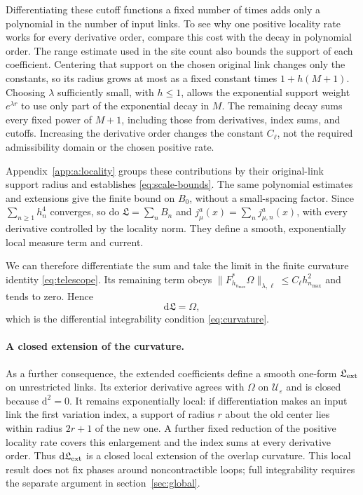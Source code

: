 \documentclass[11pt,a4paper]{article}
\theoremstyle{remark}
\newcommand{\dd}{\mathrm d}
\newcommand{\eps}{\varepsilon}
\begin{document}
Differentiating these cutoff functions a fixed number of times adds only
a polynomial in the number of input links. To see why one positive
locality rate works for every derivative order, compare this cost with
the decay in polynomial order. The range estimate used in the site count
also bounds the support of each coefficient. Centering that support on
the chosen original link changes only the constants, so its radius grows
at most as a fixed constant times $1+h(M+1)$. Choosing $\lambda$
sufficiently small, with $h\le1$, allows the
exponential support weight $e^{\lambda r}$ to use only part of the
exponential decay in $M$. The remaining decay sums every fixed power
of $M+1$, including those from derivatives, index sums, and cutoffs.
Increasing the derivative order changes the constant $C_\ell$, not
the required admissibility domain or the chosen positive rate.

Appendix~\ref{app:a:locality} groups these contributions by their
original-link support radius and establishes \eqref{eq:scale-bounds}.
The same polynomial estimates and extensions give the finite bound on
$B_0$, without a small-spacing factor. Since $\sum_{n\ge1}h_n^4$
converges, so do $\mathfrak L=\sum_nB_n$ and
$j_\mu^a(x)=\sum_nj_{\mu,n}^a(x)$, with every derivative controlled
by the locality norm. They define a smooth, exponentially local measure
term and current.

We can therefore differentiate the sum and take the limit in the finite
curvature identity \eqref{eq:telescope}. Its remaining term obeys
$\|F_{h_{n_{\max}}}^*\Omega\|_{\lambda,\ell}
\le C_\ell h_{n_{\max}}^2$ and tends to zero. Hence
\begin{equation}
 \dd\mathfrak L=\Omega,
\end{equation}
which is the differential integrability condition \eqref{eq:curvature}.

\paragraph{A closed extension of the curvature.}
As a further consequence, the extended coefficients define a smooth
one-form $\mathfrak L_{\rm ext}$ on unrestricted links. Its exterior derivative
agrees with $\Omega$ on $\mathcal U_\eps$ and is closed because
$\dd^2=0$. It remains exponentially local: if differentiation makes
an input link the first variation index, a support of radius $r$
about the old center lies within radius $2r+1$ of the new one.
A further fixed reduction of the positive locality rate covers this
enlargement and the index sums at every derivative order. Thus
$\dd\mathfrak L_{\rm ext}$ is a closed local extension of the
overlap curvature. This local result does not fix phases around
noncontractible loops; full integrability requires the separate argument
in section~\ref{sec:global}.
\end{document}
